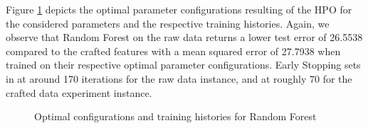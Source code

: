 Figure \ref{fig:RF_Optimal} depicts the optimal parameter configurations resulting of the HPO for the considered parameters and the respective training histories. Again, we observe that Random Forest on the raw data returns a lower test error of 26.5538 compared to the crafted features with a mean squared error of 27.7938 when trained on their respective optimal parameter configurations. Early Stopping sets in at around 170 iterations for the raw data instance, and at roughly 70 for the crafted data experiment instance. 
\begin{figure}[h]
	\centering
	\caption{Optimal configurations and training histories for Random Forest}
	\label{fig:RF_Optimal}
\end{figure}
